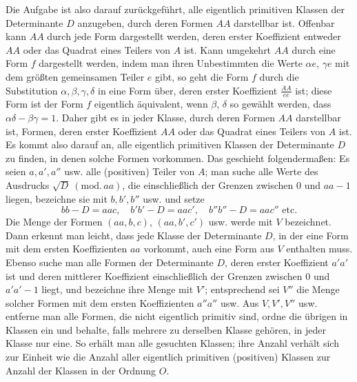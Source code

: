 Die Aufgabe ist also darauf zurückgeführt, alle eigentlich primitiven Klassen der Determinante \(D\) anzugeben, durch deren Formen \(AA\) darstellbar ist. Offenbar kann \(AA\) durch jede Form dargestellt werden, deren erster Koeffizient entweder \(AA\) oder das Quadrat eines Teilers von \(A\) ist. Kann umgekehrt \(AA\) durch eine Form \(f\) dargestellt werden, indem man ihren Unbestimmten die Werte \(\alpha e\), \(\gamma e\) mit dem größten gemeinsamen Teiler \(e\) gibt, so geht die Form \(f\) durch die Substitution \(\alpha,\beta,\gamma,\delta\) in eine Form über, deren erster Koeffizient \(\frac{AA}{ee}\) ist; diese Form ist der Form \(f\) eigentlich äquivalent, wenn \(\beta\), \(\delta\) so gewählt werden, dass \(\alpha\delta-\beta\gamma=1\). Daher gibt es in jeder Klasse, durch deren Formen \(AA\) darstellbar ist, Formen, deren erster Koeffizient \(AA\) oder das Quadrat eines Teilers von \(A\) ist. Es kommt also darauf an, alle eigentlich primitiven Klassen der Determinante \(D\) zu finden, in denen solche Formen vorkommen. Das geschieht folgendermaßen: Es seien \(a,a',a''\) usw. alle (positiven) Teiler von \(A\); man suche alle Werte des Ausdrucks \(\surd D\ (\mathrm{mod.}\,aa)\), die einschließlich der Grenzen zwischen \(0\) und \(aa-1\) liegen, bezeichne sie mit \(b,b',b''\) usw. und setze
\[
bb-D=aac,\quad b'b'-D=aac',\quad b''b''-D=aac''\text{ etc.}
\]
Die Menge der Formen \((aa,b,c)\), \((aa,b',c')\) usw. werde mit \(V\) bezeichnet. Dann erkennt man leicht, dass jede Klasse der Determinante \(D\), in der eine Form mit dem ersten Koeffizienten \(aa\) vorkommt, auch eine Form aus \(V\) enthalten muss. Ebenso suche man alle Formen der Determinante \(D\), deren erster Koeffizient \(a'a'\) ist und deren mittlerer Koeffizient einschließlich der Grenzen zwischen \(0\) und \(a'a'-1\) liegt, und bezeichne ihre Menge mit \(V'\); entsprechend sei \(V''\)
die Menge solcher Formen mit dem ersten Koeffizienten \(a''a''\) usw. Aus \(V,V',V''\) usw. entferne man alle Formen, die nicht eigentlich primitiv sind, ordne die übrigen in Klassen ein und behalte, falls mehrere zu derselben Klasse gehören, in jeder Klasse nur eine. So erhält man alle gesuchten Klassen; ihre Anzahl verhält sich zur Einheit wie die Anzahl aller eigentlich primitiven (positiven) Klassen zur Anzahl der Klassen in der Ordnung \(O\).

